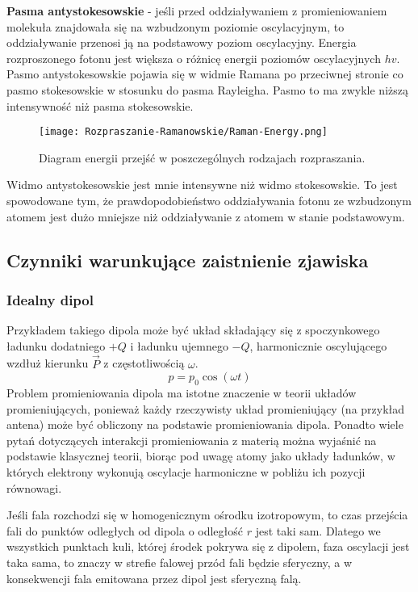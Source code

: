 \textbf{Pasma antystokesowskie} - jeśli przed oddziaływaniem z promieniowaniem molekuła znajdowała się na wzbudzonym poziomie oscylacyjnym, to oddziaływanie przenosi ją na podstawowy poziom oscylacyjny. Energia rozproszonego fotonu jest większa o różnicę energii poziomów oscylacyjnych $hv$. Pasmo antystokesowskie pojawia się w widmie Ramana po przeciwnej stronie co pasmo stokesowskie w stosunku do pasma Rayleigha. Pasmo to ma zwykle niższą intensywność niż pasma stokesowskie.
\begin{figure}[H]
	\begin{center}
		\texttt{[image: Rozpraszanie-Ramanowskie/Raman-Energy.png]}
		\caption{Diagram energii przejść w poszczególnych rodzajach rozpraszania.}
	\end{center}
\end{figure}
Widmo antystokesowskie jest mnie intensywne niż widmo stokesowskie. To jest spowodowane tym,
że prawdopodobieństwo oddziaływania fotonu ze wzbudzonym atomem jest dużo mniejsze niż
oddziaływanie z atomem w stanie podstawowym.

\subsection{Czynniki warunkujące zaistnienie zjawiska}
\subsubsection{Idealny dipol}
Przykładem takiego dipola może być układ składający się z spoczynkowego ładunku dodatniego $+Q$ i ładunku ujemnego $-Q$, harmonicznie oscylującego wzdłuż kierunku $\overrightarrow{P}$ z częstotliwością $\omega$.
\begin{equation}
	p = p_{0}\cos(\omega t)
\end{equation}
Problem promieniowania dipola ma istotne znaczenie w teorii układów promieniujących, ponieważ każdy rzeczywisty układ promieniujący (na przykład antena) może być obliczony na podstawie promieniowania dipola. Ponadto wiele pytań dotyczących interakcji promieniowania z materią można wyjaśnić na podstawie klasycznej teorii, biorąc pod uwagę atomy jako układy ładunków, w których elektrony wykonują oscylacje harmoniczne w pobliżu ich pozycji równowagi.

Jeśli fala rozchodzi się w homogenicznym ośrodku izotropowym, to czas przejścia fali do punktów odległych od dipola o odległość $r$ jest taki sam. Dlatego we wszystkich punktach kuli, której środek pokrywa się z dipolem, faza oscylacji jest taka sama, to znaczy w strefie falowej przód fali będzie sferyczny, a w konsekwencji fala emitowana przez dipol jest sferyczną falą.

